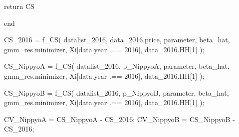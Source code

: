 \documentclass[
  letterpaper,
  DIV=11,
  numbers=noendperiod]{scrreprt}
\newenvironment{Shaded}{\begin{snugshade}}{\end{snugshade}}
\newcommand{\ControlFlowTok}[1]{\textcolor[rgb]{0.00,0.23,0.31}{#1}}
\newcommand{\FloatTok}[1]{\textcolor[rgb]{0.68,0.00,0.00}{#1}}
\newcommand{\FunctionTok}[1]{\textcolor[rgb]{0.28,0.35,0.67}{#1}}
\newcommand{\KeywordTok}[1]{\textcolor[rgb]{0.00,0.23,0.31}{#1}}
\newcommand{\NormalTok}[1]{\textcolor[rgb]{0.00,0.23,0.31}{#1}}
\newcommand{\OperatorTok}[1]{\textcolor[rgb]{0.37,0.37,0.37}{#1}}
\begin{document}
\begin{Shaded}
\begin{Highlighting}[]
    \ControlFlowTok{return}\NormalTok{ CS}
    
\KeywordTok{end}

\NormalTok{CS\_2016 }\OperatorTok{=} \FunctionTok{f\_CS}\NormalTok{(}
\NormalTok{    datalist\_2016, }
\NormalTok{    data\_2016.price, }
\NormalTok{    parameter, }
\NormalTok{    beta\_hat, }
\NormalTok{    gmm\_res.minimizer, }
\NormalTok{    Xi[data.year }\OperatorTok{.==} \FloatTok{2016}\NormalTok{], }
\NormalTok{    data\_2016.HH[}\FloatTok{1}\NormalTok{]}
\NormalTok{);}

\NormalTok{CS\_NippyoA }\OperatorTok{=} \FunctionTok{f\_CS}\NormalTok{(}
\NormalTok{    datalist\_2016, }
\NormalTok{    p\_NippyoA, }
\NormalTok{    parameter, }
\NormalTok{    beta\_hat, }
\NormalTok{    gmm\_res.minimizer, }
\NormalTok{    Xi[data.year }\OperatorTok{.==} \FloatTok{2016}\NormalTok{], }
\NormalTok{    data\_2016.HH[}\FloatTok{1}\NormalTok{]}
\NormalTok{);}

\NormalTok{CS\_NippyoB }\OperatorTok{=} \FunctionTok{f\_CS}\NormalTok{(}
\NormalTok{    datalist\_2016, }
\NormalTok{    p\_NippyoB, }
\NormalTok{    parameter, }
\NormalTok{    beta\_hat, }
\NormalTok{    gmm\_res.minimizer, }
\NormalTok{    Xi[data.year }\OperatorTok{.==} \FloatTok{2016}\NormalTok{], }
\NormalTok{    data\_2016.HH[}\FloatTok{1}\NormalTok{]}
\NormalTok{);}

\NormalTok{CV\_NippyoA }\OperatorTok{=}\NormalTok{ CS\_NippyoA }\OperatorTok{{-}}\NormalTok{ CS\_2016;}
\NormalTok{CV\_NippyoB }\OperatorTok{=}\NormalTok{ CS\_NippyoB }\OperatorTok{{-}}\NormalTok{ CS\_2016;}
\end{Highlighting}
\end{Shaded}
\end{document}
